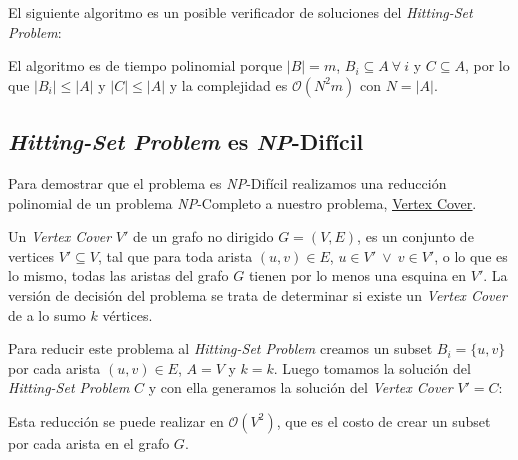 El siguiente algoritmo es un posible verificador de soluciones del
\textit{Hitting-Set Problem}:



El algoritmo es de tiempo polinomial porque $|B| = m$, $B_i \subseteq A \
\forall \ i$ y $C \subseteq A$, por lo que $|B_i| \le |A|$ y $|C| \le |A|$ y la
complejidad es $\mathcal{O}(N^2m)$ con $N = |A|$.

\subsection{\textit{Hitting-Set Problem} es \textit{NP}-Difícil}

Para demostrar que el problema es \textit{NP}-Difícil realizamos una reducción
polinomial de un problema \textit{NP}-Completo a nuestro problema,
\href{https://en.wikipedia.org/wiki/Vertex_cover}{\underline{Vertex Cover}}.

Un \textit{Vertex Cover} $V'$ de un grafo no dirigido $G = (V, E)$, es un
conjunto de vertices $V' \subseteq V$, tal que para toda arista $(u, v) \in E$,
$u \in V'\ \lor\ v \in V'$, o lo que es lo mismo, todas las aristas del grafo
$G$ tienen por lo menos una esquina en $V'$. La versión de decisión del
problema se trata de determinar si existe un \textit{Vertex Cover} de a lo sumo
$k$ vértices.

Para reducir este problema al \textit{Hitting-Set Problem} creamos un subset
$B_i = \{ u, v \}$ por cada arista $(u, v) \in E$, $A = V$ y $k = k$. Luego
tomamos la solución del \textit{Hitting-Set Problem} $C$ y con ella generamos
la solución del \textit{Vertex Cover} $V' = C$:



Esta reducción se puede realizar en $\mathcal{O}(V^2)$, que es el costo de
crear un subset por cada arista en el grafo $G$.
